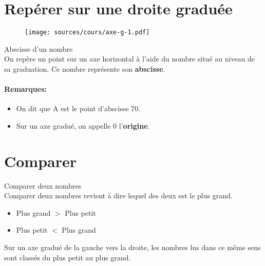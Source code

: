 \documentclass[paper=a4, fontsize=10pt]{scrartcl} %
\begin{document}
\section{Repérer sur une droite graduée}
\begin{multicols}{2}
  \begin{figure}[H]
    \centering
    \texttt{[image: sources/cours/axe-g-1.pdf]}
  \end{figure}

  \begin{Definition}{Abscisse d'un nombre}\\

    On repère un point sur un axe horizontal à l'aide du nombre situé au niveau de sa graduation. Ce nombre représente son \textbf{abscisse}.
  \end{Definition}

  \paragraph{Remarques: }
  \begin{itemize}
  \item On dit que A est le point d'abscisse 70.
  \item Sur un axe gradué, on appelle 0 l'\textbf{origine}.
  \end{itemize}
\end{multicols}

\section{Comparer}

\begin{Definition}{Comparer deux nombres}\\
  Comparer deux nombres revient à dire lequel des deux est le plus grand.\\
  \begin{itemize}
  \item Plus grand $>$ Plus petit
  \item Plus petit $<$ Plus grand
  \end{itemize}
\end{Definition}
\begin{Proposition}
  Sur un axe gradué de la gauche vers la droite, les nombres lus dans ce même sens sont classés du plus petit au plus grand.\\
\end{Proposition}
\end{document}
